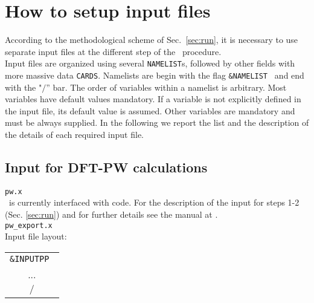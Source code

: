 
\thispagestyle{empty}
\section{How to setup input files}\label{sec:input}

\noindent According to the methodological scheme of Sec.~\ref{sec:run},
it is necessary to use separate input files at
the different step of the \WANT\ procedure.\\

\noindent Input files are organized using several {\tt NAMELIST}s,
followed by other fields with more massive data {\tt CARDS}. Namelists are
begin with the flag {\tt \&NAMELIST } and end with the
"$/$'' bar. The order of variables within a namelist is
arbitrary. Most variables have default values mandatory.
If a variable is not explicitly defined in the input file,
its default value is assumed. Other variables are mandatory and must be
always supplied.
In the following we report the list and the description
of the details of each required input file.

\subsection{Input for DFT-PW calculations}
 {\tt pw.x}
\\
\noindent \WANT\ is currently interfaced with \PWSCF code. For the
description of the input for steps 1-2 (Sec. \ref{sec:run})
and for further details see the \PWSCF manual at \PWSCFURL .\\

  {\tt pw\_export.x}
\\
\noindent Input file layout: \\

%
%
\begin{tabular}{c}
  {\tt \&INPUTPP } \\
    ... \\
  $/$
\end{tabular}
%
%
\\

